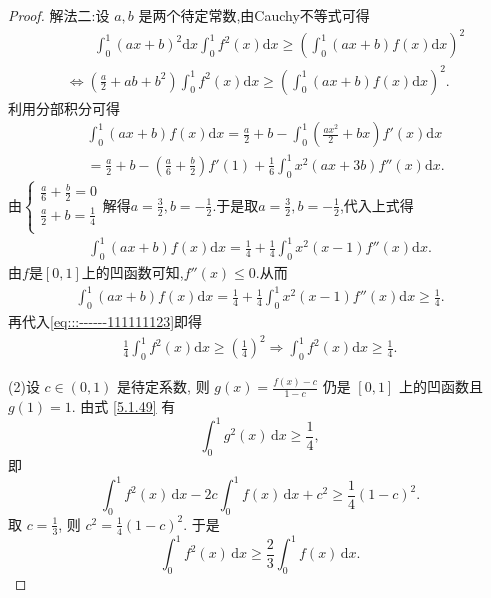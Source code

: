 \documentclass[../../main.tex]{subfiles}
\begin{document}
\begin{proof}
{\color{blue}解法二:}设 \( a,b \) 是两个待定常数,由Cauchy不等式可得
\begin{align}
&\quad \quad \int_0^1{\left( ax+b \right) ^2\mathrm{d}x}\int_0^1{f^2\left( x \right) \mathrm{d}x}\geqslant \left( \int_0^1{\left( ax+b \right) f\left( x \right) \mathrm{d}x} \right) ^2\nonumber
\\
&\Longleftrightarrow \left( \frac{a}{2}+ab+b^2 \right) \int_0^1{f^2\left( x \right) \mathrm{d}x}\geqslant \left( \int_0^1{\left( ax+b \right) f\left( x \right) \mathrm{d}x} \right) ^2.\label{eq:::------111111123}
\end{align}
利用分部积分可得
\begin{align*}
&\int_0^1{\left( ax+b \right) f\left( x \right) \mathrm{d}x}=\frac{a}{2}+b-\int_0^1{\left( \frac{ax^2}{2}+bx \right) f' \left( x \right) \mathrm{d}x}
\\
&=\frac{a}{2}+b-\left( \frac{a}{6}+\frac{b}{2} \right) f'\left( 1 \right) +\frac{1}{6}\int_0^1{x^2\left( ax+3b \right) f'' \left( x \right) \mathrm{d}x}.
\end{align*}
由$\begin{cases}
\frac{a}{6}+\frac{b}{2}=0\\
\frac{a}{2}+b=\frac{1}{4}\\
\end{cases}$解得$a=\frac{3}{2},b=-\frac{1}{2}$.于是取$a=\frac{3}{2},b=-\frac{1}{2}$,代入上式得
\begin{align*}
\int_0^1{\left( ax+b \right) f\left( x \right) \mathrm{d}x}=\frac{1}{4}+\frac{1}{4}\int_0^1{x^2\left( x-1 \right) f'' \left( x \right) \mathrm{d}x}.
\end{align*}
由$f$是$[0,1]$上的凹函数可知,$f''(x)\leqslant 0.$从而
\begin{align*}
\int_0^1{\left( ax+b \right) f\left( x \right) \mathrm{d}x}=\frac{1}{4}+\frac{1}{4}\int_0^1{x^2\left( x-1 \right) f'' \left( x \right) \mathrm{d}x}\geqslant \frac{1}{4}.
\end{align*}
再代入\eqref{eq:::------111111123}即得
\begin{align*}
\frac{1}{4}\int_0^1{f^2\left( x \right) \mathrm{d}x}\geqslant \left( \frac{1}{4} \right) ^2\Longrightarrow \int_0^1{f^2\left( x \right) \mathrm{d}x}\geqslant \frac{1}{4}.
\end{align*}

(2)设 \( c \in (0,1) \) 是待定系数, 则 \( g(x) = \frac{f(x) - c}{1 - c} \) 仍是 \([0,1]\) 上的凹函数且 \( g(1) = 1 \). 由式 \eqref{5.1.49} 有
\[
\int_{0}^{1} g^2(x) \, \mathrm{d}x \geqslant \frac{1}{4},
\]
即
\[
\int_{0}^{1} f^2(x) \, \mathrm{d}x - 2c \int_{0}^{1} f(x) \, \mathrm{d}x + c^2 \geqslant \frac{1}{4}(1 - c)^2.
\]
取 \( c = \frac{1}{3} \), 则 \( c^2 = \frac{1}{4}(1 - c)^2 \). 于是
\[
\int_{0}^{1} f^2(x) \, \mathrm{d}x \geqslant \frac{2}{3} \int_{0}^{1} f(x) \, \mathrm{d}x.
\]
\end{proof}
\end{document}
